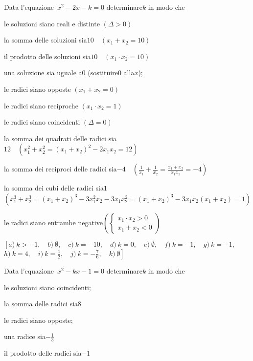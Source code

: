 \begin{esercizio}[\Ast]
 \label{ese:3.97}
Data l'equazione~$x^{2}-2 x-k = 0$ determinare$k$ in modo che
\begin{enumeratea}
\item le soluzioni siano reali e distinte \quad$(\Delta>0)$
\item la somma delle soluzioni sia$10 \quad (x_{1} + x_{2} = 10)$
\item il prodotto delle soluzioni sia$10 \quad (x_{1} \cdot x_{2} = 10)$
\item una soluzione sia uguale a$0$ \quad (sostituire$0$ alla$x$);~
\item le radici siano opposte \quad$(x_{1} + x_{2} = 0)$
\item le radici siano reciproche \quad$(x_{1} \cdot x_{2} = 1)$
\item le radici siano coincidenti \quad$(\Delta=0)$
\item la somma dei quadrati delle radici sia$12 \quad \left(x_{1}^{2} + 
x_{2}^{2} = (x_{1} + x_{2})^{2}-2x_{1} x_{2} = 12\right)$
\item la somma dei reciproci delle radici sia$-4 \quad \left(\frac{1}{x_{1}} + 
\frac{1}{x_{2}} = \frac{x_{1} +x_{2}}{x_{1} x_{2}} =-4 \right)$
\item la somma dei cubi delle radici sia$1$ \protect\\$\left( x_{1}^{3} + 
x_{2}^{3} = (x_{1} + x_{2})^{3}-3x_{1}^{2} x_{2}-3x_{1} x_{2}^{2} = (x_{1} + 
x_{2})^{3}-3x_{1} x_{2} (x_{1} + x_{2}) = 1\right)$
\item le radici siano entrambe negative$\left(\left\{\begin{array}{l} x_{1} 
\cdot x_{2} > 0 \\x_{1} + x_{2} < 0 \end{array}\right.\right)$
\end{enumeratea}
\end{esercizio}

\begin{flushright}
$\left[a)~k >-1,\quad b)~\emptyset,\quad c)~k =-10,\quad 
        d)~k = 0,\quad e)~ \emptyset ,\quad f)~ k =-1 ,\quad 
        g)~ k =-1 ,\quad \right.$
       $\left. h)~ k = 4 ,\quad i)~ k = \frac{1}{2} ,\quad 
        j)~ k =-\frac{7}{6} ,\quad k)~\emptyset\right]$
\end{flushright}

\begin{esercizio}[\Ast]
 \label{ese:3.98}
Data l'equazione~$x^{2}-k x-1 = 0$ determinare$k$ in modo che
\begin{enumeratea}
\item le soluzioni siano coincidenti;~
\item la somma delle radici sia$8$
\item le radici siano opposte;~
\item una radice sia$- \frac{1}{3}$
\item il prodotto delle radici sia$-1$
\end{enumeratea}
\end{esercizio}

